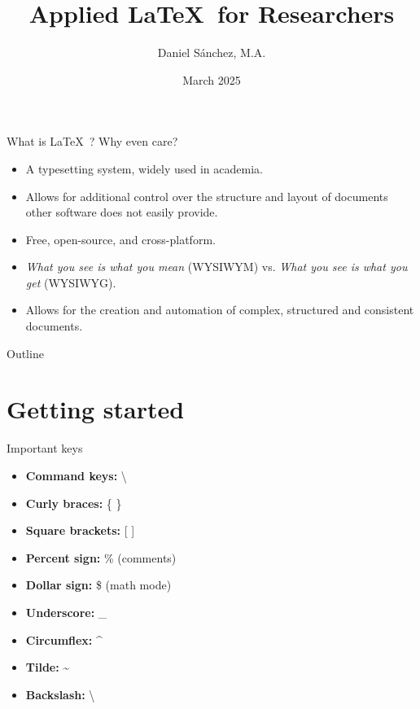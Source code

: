 \documentclass[t,12pt,xcolor=dvipsnames]{beamer}
\title[Applied \LaTeX]{Applied \LaTeX \ for Researchers}
\author[DS]{Daniel Sánchez, M.A.}
\institute{Workshops for Ukraine}
\date{March 2025}
\begin{document}
\begin{frame}
    \titlepage
\end{frame}

\begin{frame}{What is \LaTeX \ ? Why even care?}
    \begin{itemize}
    \item A typesetting system, widely used in academia.
    \item Allows for additional control over the structure and layout of documents other software does not easily provide.
    \item Free, open-source, and cross-platform.
    \item \textit{What you see is what you mean} (WYSIWYM) vs. \textit{What you see is what you get} (WYSIWYG). %
    \item Allows for the creation and automation of complex, structured and consistent documents.
    \end{itemize}
\end{frame}

\begin{frame}{Outline}
    \tableofcontents
\end{frame}

\section{Getting started}


\begin{frame}{Important keys}
    \begin{itemize}
        \item \textbf{Command keys:} \textbackslash
        \item \textbf{Curly braces:} \{ \}
        \item \textbf{Square brackets:} [ ]
        \item \textbf{Percent sign:} \% (comments)
        \item \textbf{Dollar sign:} \$ (math mode)
        \item \textbf{Underscore:} \_
        \item \textbf{Circumflex:} \^{}
        \item \textbf{Tilde:} \~{}
        \item \textbf{Backslash:} \textbackslash
\end{itemize}
\end{frame}
\end{document}
